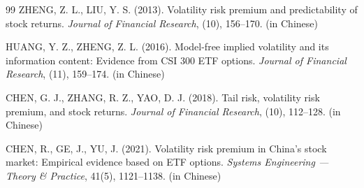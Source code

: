 \documentclass[a4paper, 12pt]{article}    %
\begin{document}
\begin{thebibliography}{99}
ZHENG, Z. L., LIU, Y. S. (2013). Volatility risk premium and predictability of stock returns. \textit{Journal of Financial Research}, (10), 156–170. (in Chinese)

HUANG, Y. Z., ZHENG, Z. L. (2016). Model-free implied volatility and its information content: Evidence from CSI 300 ETF options. \textit{Journal of Financial Research}, (11), 159–174. (in Chinese)

CHEN, G. J., ZHANG, R. Z., YAO, D. J. (2018). Tail risk, volatility risk premium, and stock returns. \textit{Journal of Financial Research}, (10), 112–128. (in Chinese)

CHEN, R., GE, J., YU, J. (2021). Volatility risk premium in China’s stock market: Empirical evidence based on ETF options. \textit{Systems Engineering — Theory & Practice}, 41(5), 1121–1138. (in Chinese)

    \end{thebibliography}
    
\end{document}
